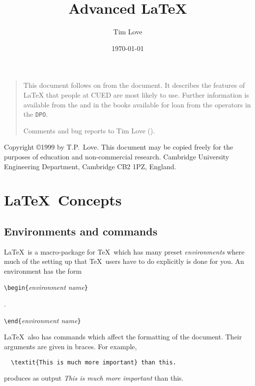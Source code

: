 \documentclass[dvips]{article}
\begin{document}
\def\xdt{$\cal X\!\!$\texttt{.desktop}}

\setlength{\parskip}{0.4em}

\title{Advanced \LaTeX}
\author{Tim Love}
\date{\today}
\maketitle

\begin{quotation}
This document follows on from the 
document. It describes the features of \LaTeX{} that people at CUED
are most likely to use. Further information is available from the 
and in the books available for loan from the operators in the 
\texttt{DPO}.

Comments and bug reports to Tim Love (). 
\end{quotation}

\begin{table}[b]
Copyright \copyright 1999 by T.P.~Love.
This document may be copied freely for the purposes 
of education and non-commercial research.
Cambridge University Engineering Department,  
Cambridge CB2 1PZ, England.
\end{table}

\tableofcontents

\pagestyle{fancy}
\section{\LaTeX\ Concepts}
\subsection{Environments and commands}
\LaTeX\ is a macro-package for \TeX\ which has many preset \emph{environments} 
where much of the setting up that \TeX\ users have to do explicitly is done
for you. An environment has the form

\verb|\begin{|\textit{environment name}\verb|}|

.

\verb|\end{|\textit{environment name}\verb|}|


\LaTeX\ also has commands which affect the formatting of the document.
Their arguments are given in braces. For example, 
\begin{verbatim}
  \textit{This is much more important} than this.
\end{verbatim}
produces as output  \textit{This is much more important} than this.
\end{document}
